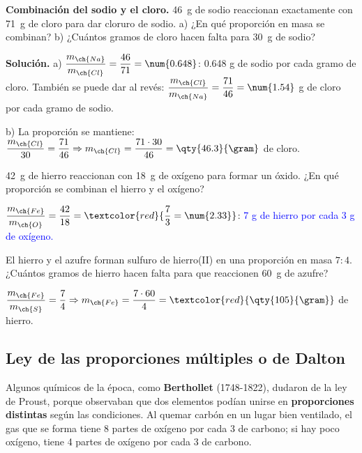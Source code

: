 \begin{example}
    \textbf{Combinación del sodio y el cloro.} \qty{46}{\gram} de sodio reaccionan exactamente con \qty{71}{\gram} de cloro para
    dar cloruro de sodio. a) ¿En qué proporción en masa se combinan? b) ¿Cuántos gramos de cloro hacen falta para \qty{30}{\gram}
    de sodio?

    \textbf{Solución.} a) \(\dfrac{m_{\ch{Na}}}{m_{\ch{Cl}}} = \dfrac{46}{71} = \num{0.648}\): \num{0.648} g de sodio por cada
    gramo de cloro. También se puede dar al revés: \(\dfrac{m_{\ch{Cl}}}{m_{\ch{Na}}} = \dfrac{71}{46} = \num{1.54}\) g de cloro
    por cada gramo de sodio.

    b) La proporción se mantiene: \(\dfrac{m_{\ch{Cl}}}{30} = \dfrac{71}{46} \Rightarrow m_{\ch{Cl}} = \dfrac{71 \cdot 30}{46} =
    \qty{46.3}{\gram}\) de cloro.
\end{example}

\begin{exercise}
    \qty{42}{\gram} de hierro reaccionan con \qty{18}{\gram} de oxígeno para formar un óxido. ¿En qué proporción se combinan el
    hierro y el oxígeno?
    \begin{solu}
        \(\dfrac{m_{\ch{Fe}}}{m_{\ch{O}}} = \dfrac{42}{18} = \textcolor{red}{\dfrac{7}{3} = \num{2.33}}\): \textcolor{blue}{7 g de
        hierro por cada 3 g de oxígeno.}
    \end{solu}
\end{exercise}

\begin{exercise}
    El hierro y el azufre forman sulfuro de hierro(II) en una proporción en masa \(7:4\). ¿Cuántos gramos de hierro hacen
    falta para que reaccionen \qty{60}{\gram} de azufre?
    \begin{solu}
        \(\dfrac{m_{\ch{Fe}}}{m_{\ch{S}}} = \dfrac{7}{4} \Rightarrow m_{\ch{Fe}} = \dfrac{7 \cdot 60}{4} =
        \textcolor{red}{\qty{105}{\gram}}\) de hierro.
    \end{solu}
\end{exercise}

\subsection{Ley de las proporciones múltiples o de Dalton}

Algunos químicos de la época, como \textbf{Berthollet} (1748-1822), dudaron de la ley de Proust, porque observaban que dos
elementos podían unirse en \textbf{proporciones distintas} según las condiciones. Al quemar carbón en un lugar bien ventilado,
el gas que se forma tiene 8 partes de oxígeno por cada 3 de carbono; si hay poco oxígeno, tiene 4 partes de oxígeno por cada
3 de carbono.

